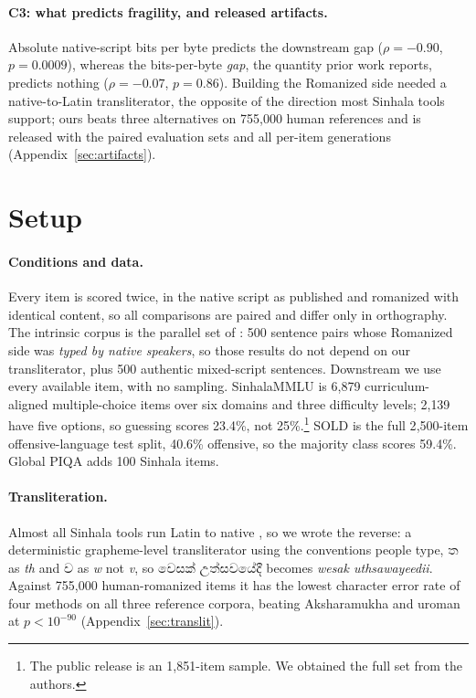 \documentclass[11pt]{article}
\newcommand{\si}[1]{{\sinhalafont #1}}
\newcommand{\rom}[1]{\textit{#1}}
\begin{document}
\paragraph{C3: what predicts fragility, and released artifacts.}
Absolute native-script bits per byte predicts the downstream gap
($\rho = -0.90$, $p = 0.0009$), whereas the bits-per-byte \emph{gap}, the quantity prior
work reports, predicts nothing ($\rho = -0.07$, $p = 0.86$). Building the Romanized side
needed a native-to-Latin transliterator, the opposite of the direction most Sinhala tools
support; ours beats three alternatives on 755{,}000 human references and is released with
the paired evaluation sets and all per-item generations
(Appendix~\ref{sec:artifacts}).

\section{Setup}
\label{sec:setup}

\paragraph{Conditions and data.}
Every item is scored twice, in the native script as published and romanized with
identical content, so all comparisons are paired and differ only in orthography. The
intrinsic corpus is the parallel set of \citet{rajapakse-weerasinghe-2026-script}: 500
sentence pairs whose Romanized side was \emph{typed by native speakers}, so those
results do not depend on our transliterator, plus 500 authentic mixed-script
sentences. Downstream we use every available item, with no sampling. SinhalaMMLU
\citep{pramodya-etal-2025-sinhalammlu} is 6{,}879 curriculum-aligned multiple-choice
items over six domains and three difficulty levels; 2{,}139 have five options, so
guessing scores 23.4\%, not 25\%.\footnote{The public release is an 1{,}851-item
sample. We obtained the full set from the authors.} SOLD
\citep{ranasinghe-etal-2025-sold} is the full 2{,}500-item offensive-language test
split, 40.6\% offensive, so the majority class scores 59.4\%. Global PIQA
\citep{desilva-ranathunga-2026-sinhalapiqa} adds 100 Sinhala items.

\paragraph{Transliteration.}
Almost all Sinhala tools run Latin to native \citep{de-mel-etal-2025-sinhala,
sumanathilaka-etal-2025-swabhasha}, so we wrote the reverse: a deterministic
grapheme-level transliterator using the conventions people type, \si{ත} as \rom{th} and
\si{ව} as \rom{w} not \rom{v}, so \si{වෙසක් උත්සවයේදී} becomes
\rom{wesak uthsawayeedii}. Against 755{,}000 human-romanized items
\citep{sumanathilaka-etal-2025-swabhasha} it has the lowest character error rate of four
methods on all three reference corpora, beating Aksharamukha
\citep{rajan-aksharamukha} and uroman \citep{hermjakob-etal-2018-uroman} at
$p < 10^{-90}$ (Appendix~\ref{sec:translit}).
\end{document}
